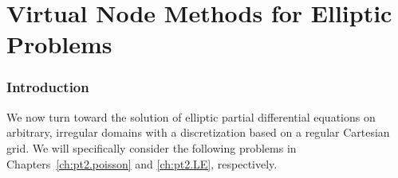 %

\part{Virtual Node Methods for Elliptic Problems}

\renewcommand{\thechapter}{\thepart}

\section*{Introduction}

We now turn toward the solution of elliptic partial differential equations on arbitrary, irregular domains with a discretization based on a regular Cartesian grid. We will specifically consider the following problems in Chapters~\ref{ch:pt2.poisson} and \ref{ch:pt2.LE}, respectively.

